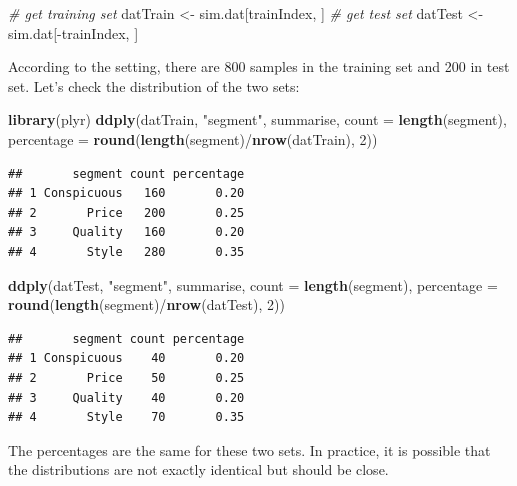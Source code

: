 \documentclass[12pt,]{krantz}
\newenvironment{Shaded}{\begin{snugshade}}{\end{snugshade}}
\newcommand{\KeywordTok}[1]{\textcolor[rgb]{0.13,0.29,0.53}{\textbf{{#1}}}}
\newcommand{\DataTypeTok}[1]{\textcolor[rgb]{0.13,0.29,0.53}{{#1}}}
\newcommand{\DecValTok}[1]{\textcolor[rgb]{0.00,0.00,0.81}{{#1}}}
\newcommand{\StringTok}[1]{\textcolor[rgb]{0.31,0.60,0.02}{{#1}}}
\newcommand{\CommentTok}[1]{\textcolor[rgb]{0.56,0.35,0.01}{\textit{{#1}}}}
\newcommand{\NormalTok}[1]{{#1}}
\theoremstyle{definition}
\theoremstyle{definition}
\theoremstyle{remark}
\begin{document}
\begin{Shaded}
\begin{Highlighting}[]
\CommentTok{# get training set}
\NormalTok{datTrain <-}\StringTok{ }\NormalTok{sim.dat[trainIndex, ]}
\CommentTok{# get test set}
\NormalTok{datTest <-}\StringTok{ }\NormalTok{sim.dat[-trainIndex, ]}
\end{Highlighting}
\end{Shaded}

According to the setting, there are 800 samples in the training set and
200 in test set. Let's check the distribution of the two sets:

\begin{Shaded}
\begin{Highlighting}[]
\KeywordTok{library}\NormalTok{(plyr)}
\KeywordTok{ddply}\NormalTok{(datTrain, }\StringTok{"segment"}\NormalTok{, summarise, }\DataTypeTok{count =} \KeywordTok{length}\NormalTok{(segment), }
    \DataTypeTok{percentage =} \KeywordTok{round}\NormalTok{(}\KeywordTok{length}\NormalTok{(segment)/}\KeywordTok{nrow}\NormalTok{(datTrain), }\DecValTok{2}\NormalTok{))}
\end{Highlighting}
\end{Shaded}

\begin{verbatim}
##       segment count percentage
## 1 Conspicuous   160       0.20
## 2       Price   200       0.25
## 3     Quality   160       0.20
## 4       Style   280       0.35
\end{verbatim}

\begin{Shaded}
\begin{Highlighting}[]
\KeywordTok{ddply}\NormalTok{(datTest, }\StringTok{"segment"}\NormalTok{, summarise, }\DataTypeTok{count =} \KeywordTok{length}\NormalTok{(segment), }
    \DataTypeTok{percentage =} \KeywordTok{round}\NormalTok{(}\KeywordTok{length}\NormalTok{(segment)/}\KeywordTok{nrow}\NormalTok{(datTest), }\DecValTok{2}\NormalTok{))}
\end{Highlighting}
\end{Shaded}

\begin{verbatim}
##       segment count percentage
## 1 Conspicuous    40       0.20
## 2       Price    50       0.25
## 3     Quality    40       0.20
## 4       Style    70       0.35
\end{verbatim}

The percentages are the same for these two sets. In practice, it is
possible that the distributions are not exactly identical but should be
close.
\end{document}
